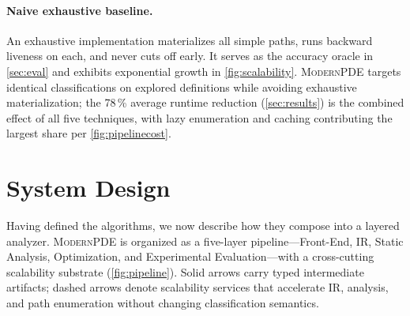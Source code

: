 \documentclass[acmsmall,screen,review,anonymous]{acmart}
\begin{document}
\paragraph{Naive exhaustive baseline.}
An exhaustive implementation materializes all simple paths, runs backward liveness on each, and never cuts off early. It serves as the accuracy oracle in \autoref{sec:eval} and exhibits exponential growth in \autoref{fig:scalability}. \textsc{ModernPDE} targets identical classifications on explored definitions while avoiding exhaustive materialization; the 78\,\% average runtime reduction (\autoref{sec:results}) is the combined effect of all five techniques, with lazy enumeration and caching contributing the largest share per \autoref{fig:pipelinecost}.

\section{System Design}
\label{sec:design}
Having defined the algorithms, we now describe how they compose into a layered analyzer. \textsc{ModernPDE} is organized as a five-layer pipeline---Front-End, IR, Static Analysis, Optimization, and Experimental Evaluation---with a cross-cutting scalability substrate (\autoref{fig:pipeline}). Solid arrows carry typed intermediate artifacts; dashed arrows denote scalability services that accelerate IR, analysis, and path enumeration without changing classification semantics.
\end{document}
